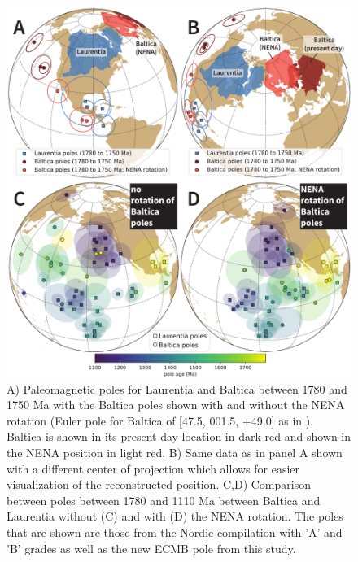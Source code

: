 \documentclass[draft]{agujournal2019}
\begin{document}
\begin{figure}[!ht]
\noindent\includegraphics[width=\textwidth]{./figures/Laurentia_Baltica.pdf}
\caption{\small{A) Paleomagnetic poles for Laurentia and Baltica between 1780 and 1750 Ma with the Baltica poles shown with and without the NENA rotation (Euler pole for Baltica of [47.5\textdegree, 001.5\textdegree, +49.0\textdegree] as in ). Baltica is shown in its present day location in dark red and shown in the NENA position in light red. B) Same data as in panel A shown with a different center of projection which allows for easier visualization of the reconstructed position. C,D) Comparison between poles between 1780 and 1110 Ma between Baltica and Laurentia without (C) and with (D) the NENA rotation. The poles that are shown are those from the Nordic compilation with 'A' and 'B' grades as well as the new ECMB pole from this study.}}
\label{fig:Laurentia_Baltica}
\end{figure}
\end{document}
